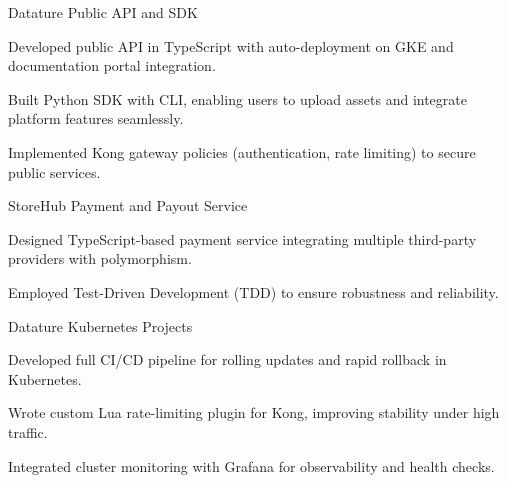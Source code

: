 
\begin{cventries}
  \cventry
    {Datature}
    {Public API and SDK}
    {}
    {}
    {
      \begin{cvitems}
        \item {Developed public API in TypeScript with auto-deployment on GKE and documentation portal integration.}
        \item {Built Python SDK with CLI, enabling users to upload assets and integrate platform features seamlessly.}
        \item {Implemented Kong gateway policies (authentication, rate limiting) to secure public services.}
      \end{cvitems}
    }

  \cventry
    {StoreHub}
    {Payment and Payout Service}
    {}
    {}
    {
      \begin{cvitems}
        \item {Designed TypeScript-based payment service integrating multiple third-party providers with polymorphism.}
        \item {Employed Test-Driven Development (TDD) to ensure robustness and reliability.}
      \end{cvitems}
    }

  \cventry
    {Datature}
    {Kubernetes Projects}
    {}
    {}
    {
      \begin{cvitems}
        \item {Developed full CI/CD pipeline for rolling updates and rapid rollback in Kubernetes.}
        \item {Wrote custom Lua rate-limiting plugin for Kong, improving stability under high traffic.}
        \item {Integrated cluster monitoring with Grafana for observability and health checks.}
      \end{cvitems}
    }
\end{cventries}
